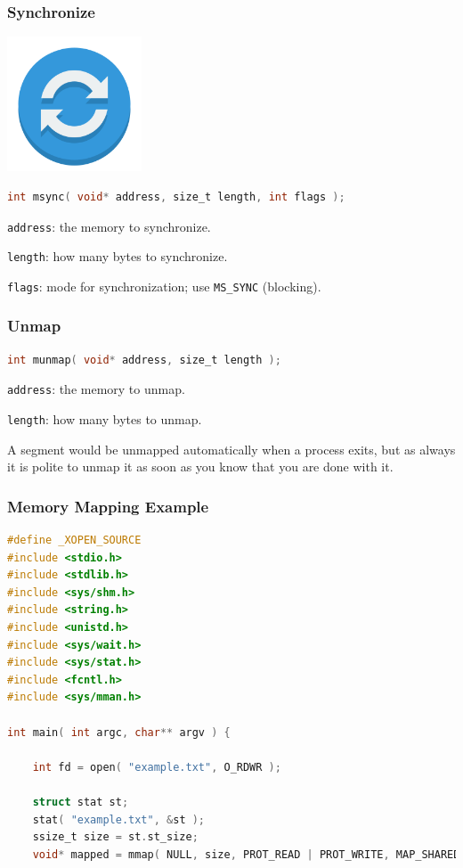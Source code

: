 \begin{frame}[fragile]
	\frametitle{Synchronize}

	\begin{center}
		\includegraphics[width=0.3\textwidth]{images/sync-icon.png}
	\end{center}

	\begin{lstlisting}[language=C]
int msync( void* address, size_t length, int flags );
\end{lstlisting}

	\texttt{address}: the memory to synchronize.

	\texttt{length}: how many bytes to synchronize.

	\texttt{flags}: mode for synchronization; use \texttt{MS\_SYNC} (blocking).

\end{frame}


\begin{frame}[fragile]
	\frametitle{Unmap}

	\begin{lstlisting}[language=C]
int munmap( void* address, size_t length );
\end{lstlisting}

	\texttt{address}: the memory to unmap.

	\texttt{length}: how many bytes to unmap.

	A segment would be unmapped automatically when a process exits, but as always it is polite to unmap it as soon as you know that you are done with it.

\end{frame}


\begin{frame}[fragile]
	\frametitle{Memory Mapping Example}

	\begin{lstlisting}[language=C]
#define _XOPEN_SOURCE
#include <stdio.h>
#include <stdlib.h>
#include <sys/shm.h>
#include <string.h>
#include <unistd.h>
#include <sys/wait.h>
#include <sys/stat.h>
#include <fcntl.h>
#include <sys/mman.h>

int main( int argc, char** argv ) { 

    int fd = open( "example.txt", O_RDWR );
    
    struct stat st; 
    stat( "example.txt", &st );
    ssize_t size = st.st_size;
    void* mapped = mmap( NULL, size, PROT_READ | PROT_WRITE, MAP_SHARED, fd, 0 );  
\end{lstlisting}
\end{frame}

